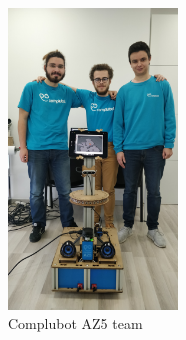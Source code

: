 \setlength\intextsep{0pt}
\begin{figure}
  \centering
  \includegraphics[width=0.4\textwidth]{images/the_team.jpg}
  \caption{Complubot AZ5 team}
  \label{fig:the_team}
\end{figure}
